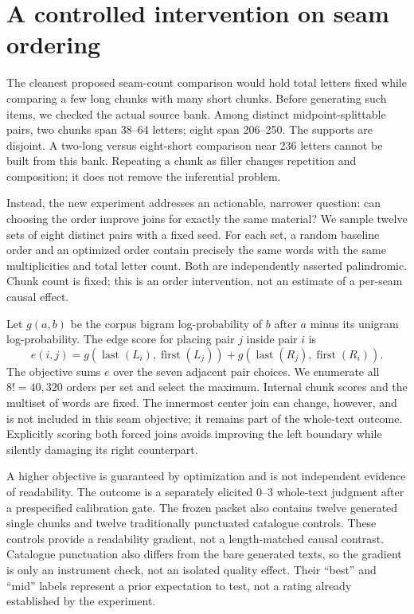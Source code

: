 \documentclass[11pt,letterpaper]{article}
\begin{document}
\section{A controlled intervention on seam ordering}
\label{sec:newseams}
The cleanest proposed seam-count comparison would hold total letters fixed while comparing a few long chunks with many short chunks. Before generating such items, we checked the actual source bank. Among distinct midpoint-splittable pairs, two chunks span 38--64 letters; eight span 206--250. The supports are disjoint. A two-long versus eight-short comparison near 236 letters cannot be built from this bank. Repeating a chunk as filler changes repetition and composition; it does not remove the inferential problem.

Instead, the new experiment addresses an actionable, narrower question: can choosing the order improve joins for exactly the same material? We sample twelve sets of eight distinct pairs with a fixed seed. For each set, a random baseline order and an optimized order contain precisely the same words with the same multiplicities and total letter count. Both are independently asserted palindromic. Chunk count is fixed; this is an order intervention, not an estimate of a per-seam causal effect.

Let $g(a,b)$ be the corpus bigram log-probability of $b$ after $a$ minus its unigram log-probability. The edge score for placing pair $j$ inside pair $i$ is
\[
 e(i,j)=g(\operatorname{last}(L_i),\operatorname{first}(L_j))
       +g(\operatorname{last}(R_j),\operatorname{first}(R_i)).
\]
The objective sums $e$ over the seven adjacent pair choices. We enumerate all $8!=40,320$ orders per set and select the maximum. Internal chunk scores and the multiset of words are fixed. The innermost center join can change, however, and is not included in this seam objective; it remains part of the whole-text outcome. Explicitly scoring both forced joins avoids improving the left boundary while silently damaging its right counterpart.

A higher objective is guaranteed by optimization and is not independent evidence of readability. The outcome is a separately elicited 0--3 whole-text judgment after a prespecified calibration gate. The frozen packet also contains twelve generated single chunks and twelve traditionally punctuated catalogue controls. These controls provide a readability gradient, not a length-matched causal contrast. Catalogue punctuation also differs from the bare generated texts, so the gradient is only an instrument check, not an isolated quality effect. Their ``best'' and ``mid'' labels represent a prior expectation to test, not a rating already established by the experiment.
\end{document}
